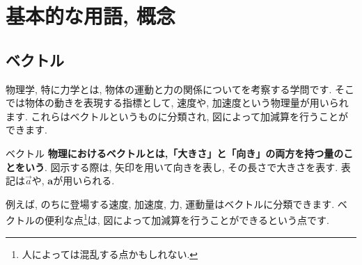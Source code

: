 \documentclass[11pt,dvipdfmx]{jsarticle}
\numberwithin{equation}{section} %
\begin{document}
\section{基本的な用語, 概念}
\subsection{ベクトル}
物理学, 特に力学とは, 物体の運動と力の関係についてを考察する学問です. そこでは物体の動きを表現する指標として, 速度や, 加速度という物理量が用いられます. これらはベクトルというものに分類され, 図によって加減算を行うことができます. 
\begin{freebox}{ベクトル}
\textbf{物理におけるベクトルとは,「大きさ」と「向き」の両方を持つ量のことをいう}. 図示する際は, 矢印を用いて向きを表し, その長さで大きさを表す. 表記は$\overset{\rightarrow}{a}$や, $\bm{a}$が用いられる.
\end{freebox}
例えば, のちに登場する速度, 加速度, 力, 運動量はベクトルに分類できます. ベクトルの便利な点\footnote{人によっては混乱する点かもしれない.}は, 図によって加減算を行うことができるという点です. 
\end{document}
